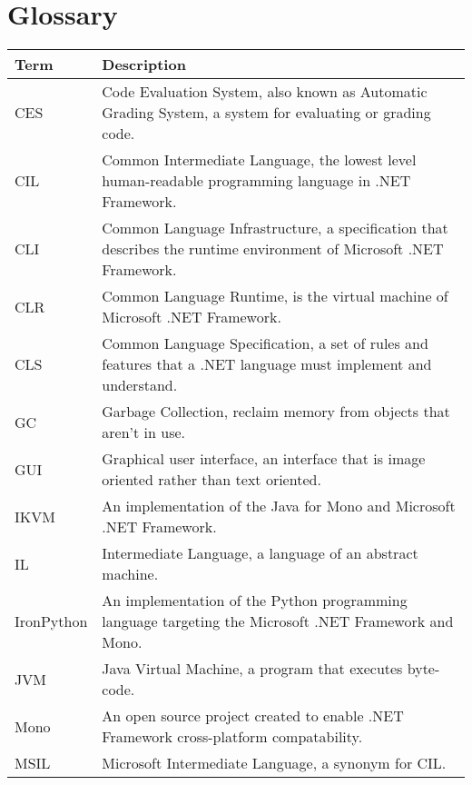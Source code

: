 \chapter*{Glossary}

\begin{center}
	\begin{tabular} { m{3cm} | m{11cm} }
		\hline
		\textbf{Term}	& \textbf{Description} \\ \hline
		CES				& Code Evaluation System, also known as Automatic Grading System, a system for evaluating or grading code. \\ \hline
		CIL				& Common Intermediate Language, the lowest level human-readable programming language in .NET Framework. \\ \hline
		CLI				& Common Language Infrastructure, a specification that describes the runtime environment of Microsoft .NET Framework. \\ \hline
		CLR				& Common Language Runtime, is the virtual machine of Microsoft .NET Framework. \\ \hline
		CLS				& Common Language Specification, a set of rules and features that a .NET language must implement and understand. \\ \hline
		GC 				& Garbage Collection, reclaim memory from objects that aren't in use. \\ \hline
		GUI				& Graphical user interface, an interface that is image oriented rather than text oriented. \\ \hline
		IKVM			& An implementation of the Java for Mono and Microsoft .NET Framework. \\ \hline
		IL				& Intermediate Language, a language of an abstract machine. \\ \hline
		IronPython		& An implementation of the Python programming language targeting the Microsoft .NET Framework and Mono. \\ \hline
		JVM				& Java Virtual Machine, a program that executes byte-code. \\ \hline
		Mono			& An open source project created to enable .NET Framework cross-platform compatability. \\ \hline
		MSIL			& Microsoft Intermediate Language, a synonym for CIL. \\ \hline
	\end{tabular}
\end{center}


